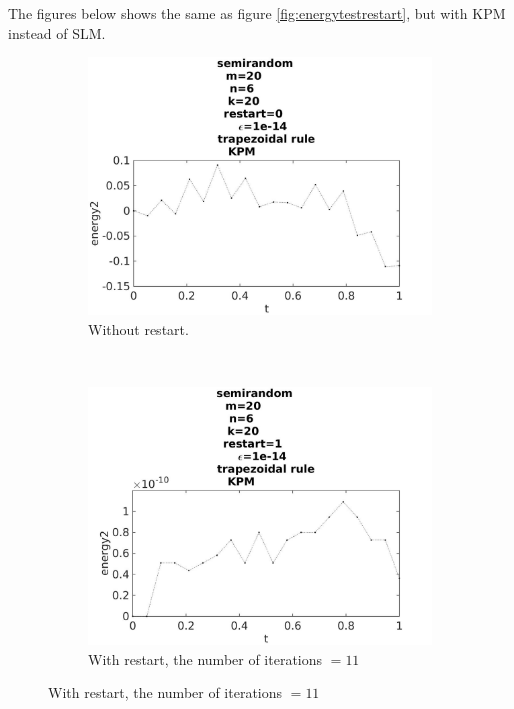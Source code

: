 The figures below shows the same as figure \ref{fig:energytestrestart}, but with KPM instead of SLM. 

\begin{figure}[H]
        \centering
        \begin{subfigure}[b]{0.45\textwidth}
                \includegraphics[width=\textwidth]{../MATLAB/fig/energyarnrestart0.jpg}
                \caption{  Without restart. }
                \label{fig:energyarnrestart0}
        \end{subfigure}%
        ~
        \begin{subfigure}[b]{0.45\textwidth}
                \includegraphics[width=\textwidth]{../MATLAB/fig/energyarnrestart1.jpg}
                \caption{ With restart, the number of iterations $ = 11$ }
                \label{fig:energyarnrestart1}
        \end{subfigure}
        

\end{figure}
